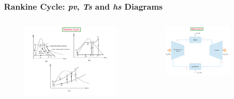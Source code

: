\documentclass[10pt,compress]{beamer}
\begin{document}
\begin{frame}
 \frametitle{Rankine Cycle: {\it pv}, {\it Ts} and {\it hs} Diagrams}
 \begin{columns}
   \begin{column}[c]{0.55\linewidth}
    \begin{figure}%
     \begin{center}
      \includegraphics[width=7.5cm,clip]{./Pics/Simple_Rankine_Cycle_Diagrams}
     \end{center}
    \end{figure}  
   \end{column}
   \begin{column}[l]{0.45\linewidth}
    \begin{figure}%
     \begin{center}
      \includegraphics[width=5.5cm,clip]{./Pics/Simple_Rankine_Cycle}
     \end{center}
    \end{figure} 
   \end{column}
  \end{columns}
\end{frame}
\end{document}

